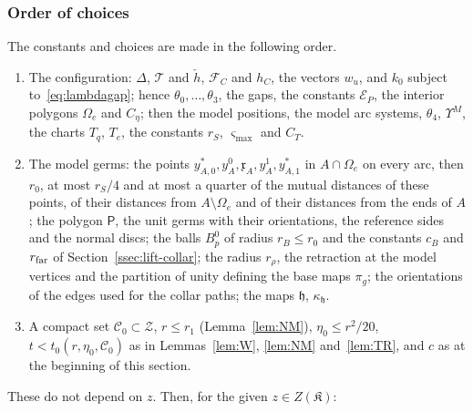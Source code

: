 \subsubsection*{Order of choices}
The constants and choices are made in the following order.
\begin{enumerate}
\item The configuration: $\Delta$, $\mathcal T$ and $\check h$, $\mathcal F_C$ and $h_C$, the vectors $w_u$, and $k_0$ subject
to~\eqref{eq:lambdagap}; hence $\theta_0,\dots,\theta_3$, the gaps, the constants $\mathcal E_P$, the interior polygons
$\Omega_e$ and $C_\eta$; then the model positions, the model arc systems, $\theta_4$, $\Upsilon^M$, the charts $T_q$, $T_e$,
the constants $r_S$, $\varsigma_{\max}$ and $C_T$.
\item The model germs: the points $y^*_{A,0},y^0_A,\mathfrak x_A,y^1_A,y^*_{A,1}$ in $A\cap\Omega_e$ on every arc, then
$r_0$, at most $r_S/4$ and at most a quarter of the mutual distances of these points, of their distances from
$A\setminus\Omega_e$ and of their distances from the ends of $A$; the polygon $\mathsf P$, the unit germs with their orientations, the reference sides and the normal
discs; the balls $B^0_p$ of radius $r_B\le r_0$ and the constants $c_B$ and $r_{\rm far}$ of Section~\ref{ssec:lift-collar}; the radius $r_\rho$, the retraction at the model vertices and the
partition of unity defining the base maps $\pi_g$; the orientations
of the edges used for the collar paths; the maps $\mathfrak h$, $\kappa_{\mathfrak h}$.
\item A compact set $\mathscr C_0\subset\mathcal Z$, $r\le r_1$ (Lemma~\ref{lem:NM}), $\eta_0\le r^2/20$,
$t<t_0(r,\eta_0,\mathscr C_0)$ as in Lemmas~\ref{lem:W}, \ref{lem:NM} and~\ref{lem:TR}, and $c$ as at the beginning of this
section.
\end{enumerate}
These do not depend on $z$. Then, for the given $z\in Z(\mathfrak K)$:
